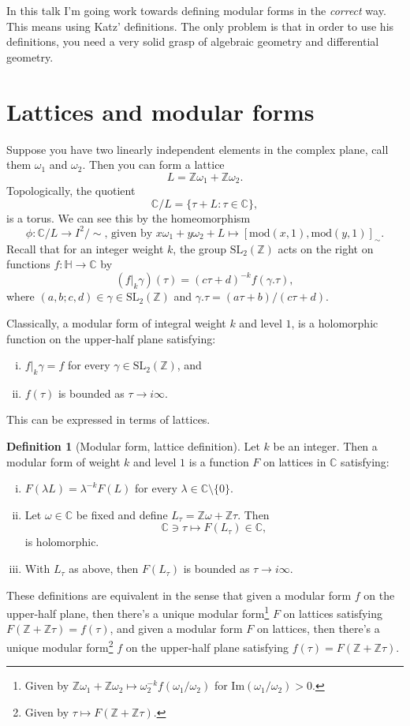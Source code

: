 \documentclass{article}
\theoremstyle{definition}
\newtheorem{defi}{Definition}
\begin{document}
In this talk I'm going work towards defining modular forms in the {\it correct} way. This means using Katz' definitions. The only problem is that in order to use his definitions, you need a very solid grasp of algebraic geometry and differential geometry.
\section{Lattices and modular forms}
Suppose you have two linearly independent elements in the complex plane, call them $\omega_1$ and $\omega_2$. Then you can form a lattice
\[L=\mathbb{Z}\omega_1+\mathbb{Z}\omega_2.\]
Topologically, the quotient
\[\mathbb{C}/L=\{\tau+L:\tau\in\mathbb{C}\},\]
is a torus. We can see this by the homeomorphism
\[\phi:\mathbb{C}/L\to I^2/{\sim}\text{, given by }x\omega_1+y\omega_2+L\mapsto [\mathrm{mod}(x,1),\mathrm{mod}(y,1)]_{\sim}.\]
Recall that for an integer weight $k$, the group $\mathrm{SL}_2(\mathbb{Z})$ acts on the right on functions $f:\mathbb{H}\to\mathbb{C}$ by
\[(f|_k\gamma)(\tau)=(c\tau+d)^{-k}f(\gamma.\tau),\]
where $(a,b;c,d)\in\gamma\in\mathrm{SL}_2(\mathbb{Z})$ and $\gamma.\tau=(a\tau+b)/(c\tau+d)$.

Classically, a modular form of integral weight $k$ and level $1$, is a holomorphic function on the upper-half plane satisfying:
\begin{enumerate}[(i)]
  \item $f|_k\gamma=f$ for every $\gamma\in\mathrm{SL}_2(\mathbb{Z})$, and
  \item $f(\tau)$ is bounded as $\tau\to i\infty$.
\end{enumerate}
This can be expressed in terms of lattices.
\begin{defi}[Modular form, lattice definition]
  Let $k$ be an integer. Then a modular form of weight $k$ and level $1$ is a function $F$ on lattices in $\mathbb{C}$ satisfying:
  \begin{enumerate}[(i)]
    \item $F(\lambda L)=\lambda^{-k}F(L)$ for every $\lambda\in\mathbb{C}\setminus\{0\}$.
    \item Let $\omega\in\mathbb{C}$ be fixed and define $L_\tau=\mathbb{Z}\omega+\mathbb{Z}\tau$. Then
      \[\mathbb{C}\ni\tau\mapsto F(L_\tau)\in\mathbb{C},\]
      is holomorphic.
    \item With $L_\tau$ as above, then $F(L_\tau)$ is bounded as $\tau\to i\infty$.
  \end{enumerate}
\end{defi}
These definitions are equivalent in the sense that given a modular form $f$ on the upper-half plane, then there's a unique modular form\footnote{Given by $\mathbb{Z}\omega_1+\mathbb{Z}\omega_2\mapsto \omega_2^{-k}f(\omega_1/\omega_2)$ for $\mathrm{Im}(\omega_1/\omega_2)>0$.} $F$ on lattices satisfying $F(\mathbb{Z}+\mathbb{Z}\tau)=f(\tau)$, and given a modular form $F$ on lattices, then there's a unique modular form\footnote{Given by $\tau\mapsto F(\mathbb{Z}+\mathbb{Z}\tau)$.} $f$ on the upper-half plane satisfying $f(\tau)=F(\mathbb{Z}+\mathbb{Z}\tau)$.
\end{document}
